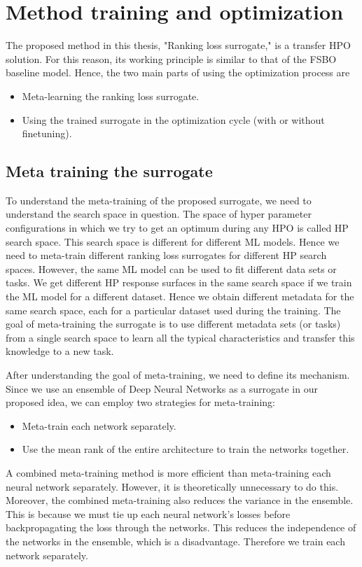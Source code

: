 \documentclass[12pt, twoside, ngerman]{report}
\begin{document}

\section{Method training and optimization}

The proposed method in this thesis, "Ranking loss surrogate," is a transfer HPO solution.
For this reason, its working principle is similar to that of the FSBO baseline model.
Hence, the two main parts of using the optimization process are
\begin{itemize}
\item Meta-learning the ranking loss surrogate.
\item Using the trained surrogate in the optimization cycle (with or without finetuning).
\end{itemize}

\subsection{Meta training the surrogate}\label{sec:rlmetatraining}

To understand the meta-training of the proposed surrogate, we need to understand the search space in question. The space of hyper parameter configurations in which we try to get an optimum during any HPO is called HP search space.
This search space is different for different ML models.
Hence we need to meta-train different ranking loss surrogates for different HP search spaces.
However, the same ML model can be used to fit different data sets or tasks.
We get different HP response surfaces in the same search space if we train the ML model for a different dataset.
Hence we obtain different metadata for the same search space, each for a particular dataset used during the training.
The goal of meta-training the surrogate is to use different metadata sets (or tasks) from a single search space to learn all the typical characteristics and transfer this knowledge to a new task.

After understanding the goal of meta-training, we need to define its mechanism. Since we use an ensemble of Deep Neural Networks as a surrogate in our proposed idea, we can employ two strategies for meta-training:
\begin{itemize}
\item Meta-train each network separately.
\item Use the mean rank of the entire architecture to train the networks together.
\end{itemize}
A combined meta-training method is more efficient than meta-training each neural network separately.
However, it is theoretically unnecessary to do this.
Moreover, the combined meta-training also reduces the variance in the ensemble. This is because we must tie up each neural network's losses before backpropagating the loss through the networks. This reduces the independence of the networks in the ensemble, which is a disadvantage.
Therefore we train each network separately.
\end{document}
